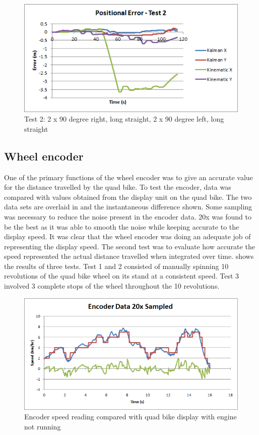 \documentclass[main.tex]{subfiles}
\begin{document}
\begin{figure}[ht]
\includegraphics[width=\textwidth]{5-Testing/position_error_test_2.png}
\centering
\caption{Test 2: 2 x 90 degree right, long straight, 2 x 90 degree left, long straight} 
\end{figure}

\subsection{Wheel encoder}
One of the primary functions of the wheel encoder was to give an accurate value for the distance travelled by the quad bike. To test the encoder, data was compared with values obtained from the display unit on the quad bike. The two data sets are overlaid in  and the instantaneous difference shown. Some sampling was necessary to reduce the noise present in the encoder data. 20x was found to be the best as it was able to smooth the noise while keeping accurate to the display speed. It was clear that the wheel encoder was doing an adequate job of representing the display speed. The second test was to evaluate how accurate the speed represented the actual distance travelled when integrated over time.  shows the results of three tests. Test 1 and 2 consisted of manually spinning 10 revolutions of the quad bike wheel on its stand at a consistent speed. Test 3 involved 3 complete stops of the wheel throughout the 10 revolutions.

\begin{figure}[ht]
\includegraphics[width=1\textwidth]{5-Testing/encoder_data_20x_sampled.png}
\centering
\caption{Encoder speed reading compared with quad bike display with engine not running}
\end{figure}
\end{document}

